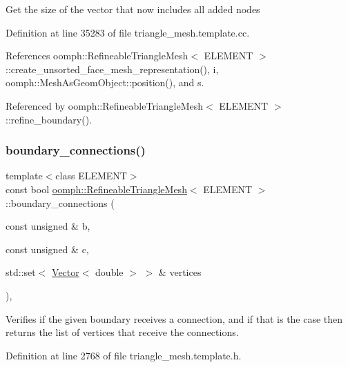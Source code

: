 Get the size of the vector that now includes all added nodes 

Definition at line 35283 of file triangle\+\_\+mesh.\+template.\+cc.



References oomph\+::\+Refineable\+Triangle\+Mesh$<$ E\+L\+E\+M\+E\+N\+T $>$\+::create\+\_\+unsorted\+\_\+face\+\_\+mesh\+\_\+representation(), i, oomph\+::\+Mesh\+As\+Geom\+Object\+::position(), and s.



Referenced by oomph\+::\+Refineable\+Triangle\+Mesh$<$ E\+L\+E\+M\+E\+N\+T $>$\+::refine\+\_\+boundary().

\mbox{\label{classoomph_1_1RefineableTriangleMesh_a44ebcc99018e3d6795eca66ea20628b0}} 
\subsubsection{\texorpdfstring{boundary\+\_\+connections()}{boundary\_connections()}}
{\footnotesize\ttfamily template$<$class E\+L\+E\+M\+E\+NT$>$ \\
const bool \hyperlink{classoomph_1_1RefineableTriangleMesh}{oomph\+::\+Refineable\+Triangle\+Mesh}$<$ E\+L\+E\+M\+E\+NT $>$\+::boundary\+\_\+connections (\begin{DoxyParamCaption}\item[{const unsigned \&}]{b,  }\item[{const unsigned \&}]{c,  }\item[{std\+::set$<$ \hyperlink{classoomph_1_1Vector}{Vector}$<$ double $>$ $>$ \&}]{vertices }\end{DoxyParamCaption})\hspace{0.3cm}{\ttfamily [inline]}, {\ttfamily [protected]}}



Verifies if the given boundary receives a connection, and if that is the case then returns the list of vertices that receive the connections. 



Definition at line 2768 of file triangle\+\_\+mesh.\+template.\+h.

\mbox{\label{classoomph_1_1RefineableTriangleMesh_a0e2797cd90b0f9afabac4ec28576de05}} 
